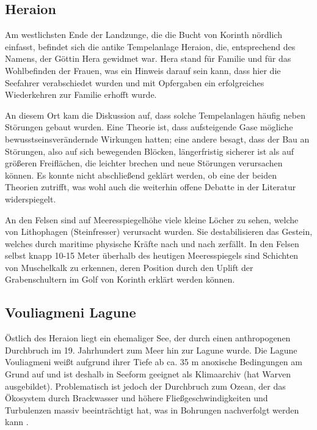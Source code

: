 \documentclass[preprint]{geomorphica} %
\begin{document}
\subsection{Heraion}

Am westlichsten Ende der Landzunge, die die Bucht von Korinth nördlich einfasst, befindet sich die antike Tempelanlage Heraion, die, entsprechend des Namens, der Göttin Hera gewidmet war. Hera stand für Familie und für das Wohlbefinden der Frauen, was ein Hinweis darauf sein kann, dass hier die Seefahrer verabschiedet wurden und mit Opfergaben ein erfolgreiches Wiederkehren zur Familie erhofft wurde.

An diesem Ort kam die Diskussion auf, dass solche Tempelanlagen häufig neben Störungen gebaut wurden. Eine Theorie ist, dass aufsteigende Gase mögliche bewusstseinsverändernde Wirkungen hatten; eine andere besagt, dass der Bau an Störungen, also auf sich bewegenden Blöcken, längerfristig sicherer ist als auf größeren Freiflächen, die leichter brechen und neue Störungen verursachen können. Es konnte nicht abschließend geklärt werden, ob eine der beiden Theorien zutrifft, was wohl auch die weiterhin offene Debatte in der Literatur widerspiegelt.

An den Felsen sind auf Meeresspiegelhöhe viele kleine Löcher zu sehen, welche von Lithophagen (Steinfresser) verursacht wurden. Sie destabilisieren das Gestein, welches durch maritime physische Kräfte nach und nach zerfällt. In den Felsen selbst knapp 10-15 Meter überhalb des heutigen Meeresspiegels sind Schichten von Muschelkalk zu erkennen, deren Position durch den Uplift der Grabenschultern im Golf von Korinth erklärt werden können.

\subsection{Vouliagmeni Lagune}

Östlich des Heraion liegt ein ehemaliger See, der durch einen anthropogenen Durchbruch im 19. Jahrhundert zum Meer hin zur Lagune wurde. Die Lagune Vouliagmeni weißt aufgrund ihrer Tiefe ab ca. 35 m anoxische Bedingungen am Grund auf und ist deshalb in Seeform geeignet als Klimaarchiv (hat Warven ausgebildet). Problematisch ist jedoch der Durchbruch zum Ozean, der das Ökosystem durch Brackwasser und höhere Fließgeschwindigkeiten und Turbulenzen massiv beeinträchtigt hat, was in Bohrungen nachverfolgt werden kann \cite{emmanouilidisHolocenePaleoclimateVariability2022}.

\end{document}
